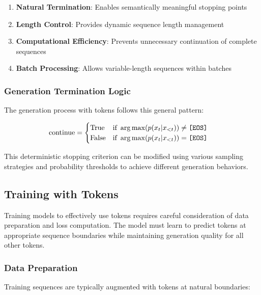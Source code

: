 \begin{enumerate}
\item \textbf{Natural Termination}: Enables semantically meaningful stopping points
\item \textbf{Length Control}: Provides dynamic sequence length management
\item \textbf{Computational Efficiency}: Prevents unnecessary continuation of complete sequences
\item \textbf{Batch Processing}: Allows variable-length sequences within batches
\end{enumerate}

\subsubsection{Generation Termination Logic}

The generation process with \eos{} tokens follows this general pattern:

\begin{align}
\text{continue} &= \begin{cases} 
\text{True} & \text{if } \arg\max(p(x_t | x_{<t})) \neq \text{\texttt{[EOS]}{}} \\
\text{False} & \text{if } \arg\max(p(x_t | x_{<t})) = \text{\texttt{[EOS]}{}}
\end{cases}
\end{align}

This deterministic stopping criterion can be modified using various sampling strategies and probability thresholds to achieve different generation behaviors.

\subsection{Training with \eos{} Tokens}

Training models to effectively use \eos{} tokens requires careful consideration of data preparation and loss computation. The model must learn to predict \eos{} tokens at appropriate sequence boundaries while maintaining generation quality for all other tokens.

\subsubsection{Data Preparation}

Training sequences are typically augmented with \eos{} tokens at natural boundaries:


